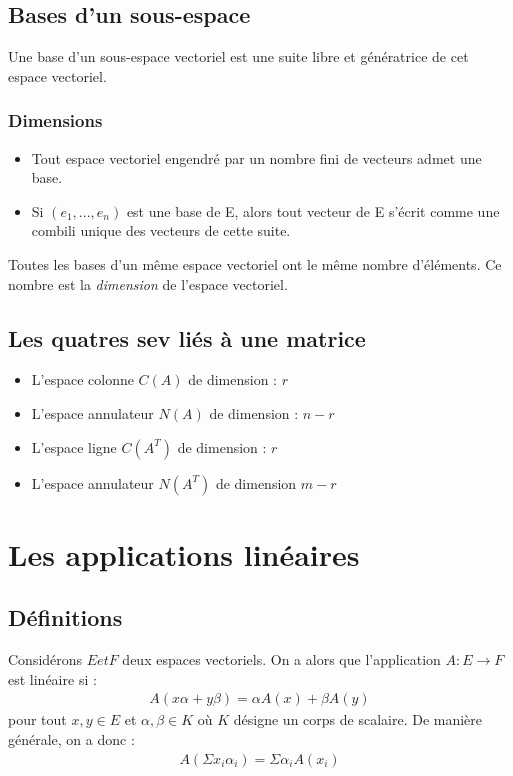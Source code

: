 \documentclass[a4paper]{book}
\begin{document}
\section{Bases d'un sous-espace}
Une base d'un sous-espace vectoriel est une suite libre et génératrice de cet espace vectoriel.
\subsection{Dimensions}
\begin{itemize}
    \item Tout espace vectoriel engendré par un nombre fini de vecteurs admet une base.
    \item Si $(e_1,...,e_n)$ est une base de E, alors tout vecteur de E s'écrit comme une combili unique des vecteurs de cette suite.
\end{itemize}
\begin{framed}
Toutes les bases d'un même espace vectoriel ont le même nombre d'éléments. Ce nombre est la \emph{dimension} de l'espace vectoriel.
\end{framed}
\section{Les quatres sev liés à une matrice}
\begin{itemize}
    \item L'espace colonne $C(A)$ de dimension : $r$
    \item L'espace annulateur $N(A)$ de dimension : $n-r$
    \item L'espace ligne $C(A^T)$ de dimension : $r$
    \item L'espace annulateur $N(A^T)$ de dimension $m-r$
\end{itemize}

\chapter{Les applications linéaires}
\section{Définitions}
Considérons $E et F$ deux espaces vectoriels. On a alors que l'application $A : E \rightarrow F$ est linéaire si :
\begin{gather}
    A(x\alpha + y\beta) = \alpha A(x) + \beta A(y)
\end{gather}
pour tout $x,y \in E$ et $\alpha ,\beta \in K$ où $K$ désigne un corps de scalaire.
\newline \indent De manière générale, on a donc : 
\begin{gather}
    A(\Sigma x_i \alpha_i) = \Sigma \alpha_i A(x_i)
\end{gather}
\end{document}
